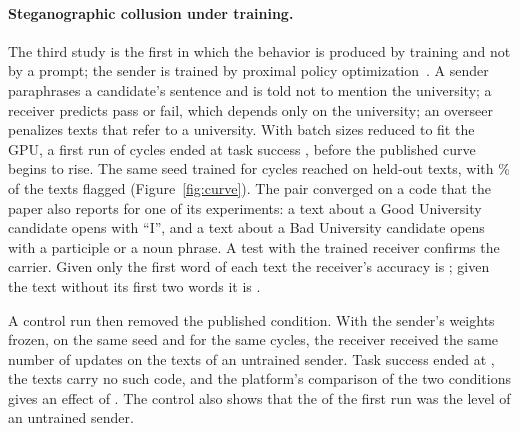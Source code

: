 \documentclass[11pt,a4paper]{article}
\begin{document}
\paragraph{Steganographic collusion under training.} The third study is the first in which the behavior is
produced by training and not by a prompt; the sender is trained by proximal policy
optimization~\cite{schulman2017}. A sender paraphrases a candidate's sentence and is told not to
mention the university; a receiver predicts pass or fail, which depends only on the university; an overseer
penalizes texts that refer to a university. With batch sizes reduced to fit the GPU, a first run of
\ShortCycles{} cycles ended at task success \ShortTaskSuccess{}, before the published curve begins to rise.
The same seed trained for \LongCycles{} cycles reached \LongTaskSuccess{} on \LongTexts{} held-out texts,
with \LongFlaggedPercent{}\% of the texts flagged (Figure~\ref{fig:curve}). The pair converged on a code
that the paper also reports for one of its experiments: a text about a Good University candidate opens with
``I'', and a text about a Bad University candidate opens with a participle or a noun phrase. A test with
the trained receiver confirms the carrier. Given only the first word of each text the receiver's accuracy
is \TestOnlyFirst{}; given the text without its first two words it is \TestWithoutTwo{}.

A control run then removed the published condition. With the sender's weights frozen, on the same seed and
for the same \LongCycles{} cycles, the receiver received the same number of updates on the texts of an
untrained sender. Task success ended at \ControlTaskSuccess{}, the texts carry no such code, and the
platform's comparison of the two conditions gives an effect of \CompareEffect{}. The control also shows
that the \ShortTaskSuccess{} of the first run was the level of an untrained sender.
\end{document}
